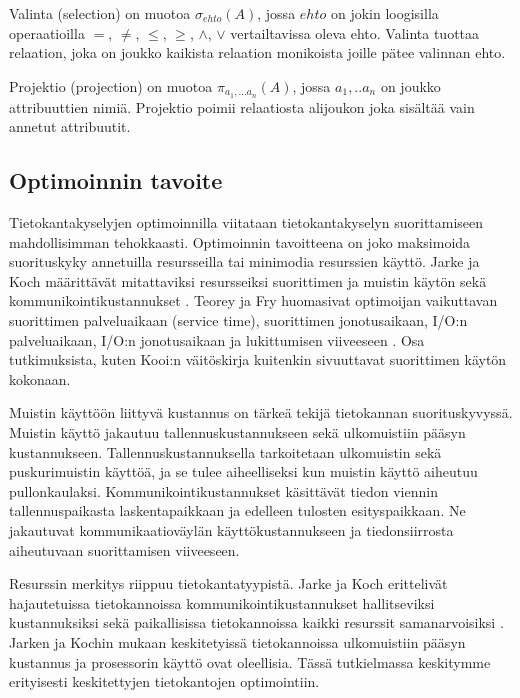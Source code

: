 \documentclass[finnish]{tktltiki2}
\theoremstyle{definition}
\theoremstyle{remark}
\begin{document}
Valinta (selection) on muotoa $\sigma_{ehto}(A)$, jossa $ehto$ on jokin loogisilla operaatioilla $=$, $\neq$, $\leq$, $\geq$, $\wedge$, $\vee$ vertailtavissa oleva ehto. Valinta tuottaa relaation, joka on joukko kaikista relaation monikoista joille pätee valinnan ehto.	

Projektio (projection) on muotoa $\pi_{a_1,...a_n}(A)$, jossa $a_1,..a_n$ on joukko attribuuttien nimiä. Projektio poimii relaatiosta alijoukon joka sisältää vain annetut attribuutit.


\subsection{Optimoinnin tavoite}
Tietokantakyselyjen optimoinnilla viitataan tietokantakyselyn suorittamiseen mahdollisimman tehokkaasti. Optimoinnin tavoitteena on joko maksimoida suorituskyky annetuilla resursseilla tai minimodia resurssien käyttö. Jarke ja Koch määrittävät mitattaviksi resursseiksi suorittimen ja muistin käytön sekä kommunikointikustannukset \cite{jarke1984}. Teorey ja Fry huomasivat optimoijan vaikuttavan suorittimen palveluaikaan (service time), suorittimen jonotusaikaan, I/O:n palveluaikaan, I/O:n jonotusaikaan ja lukittumisen viiveeseen \cite{teorey1982design}. Osa tutkimuksista, kuten Kooi:n väitöskirja \cite{kooi1980optimization} kuitenkin sivuuttavat suorittimen käytön kokonaan.

Muistin käyttöön liittyvä kustannus on tärkeä tekijä tietokannan suorituskyvyssä. Muistin käyttö jakautuu tallennuskustannukseen sekä ulkomuistiin pääsyn kustannukseen. Tallennuskustannuksella tarkoitetaan ulkomuistin sekä puskurimuistin käyttöä, ja se tulee aiheelliseksi kun muistin käyttö aiheutuu pullonkaulaksi. Kommunikointikustannukset käsittävät tiedon viennin tallennuspaikasta laskentapaikkaan ja edelleen tulosten esityspaikkaan. Ne jakautuvat kommunikaatioväylän käyttökustannukseen ja tiedonsiirrosta aiheutuvaan suorittamisen viiveeseen.

Resurssin merkitys riippuu tietokantatyypistä. Jarke ja Koch erittelivät hajautetuissa tietokannoissa kommunikointikustannukset hallitseviksi kustannuksiksi sekä paikallisissa tietokannoissa kaikki resurssit samanarvoisiksi \cite{jarke1984}. Jarken ja Kochin mukaan keskitetyissä tietokannoissa ulkomuistiin pääsyn kustannus ja prosessorin käyttö ovat oleellisia. Tässä tutkielmassa keskitymme erityisesti keskitettyjen tietokantojen optimointiin.
\end{document}
